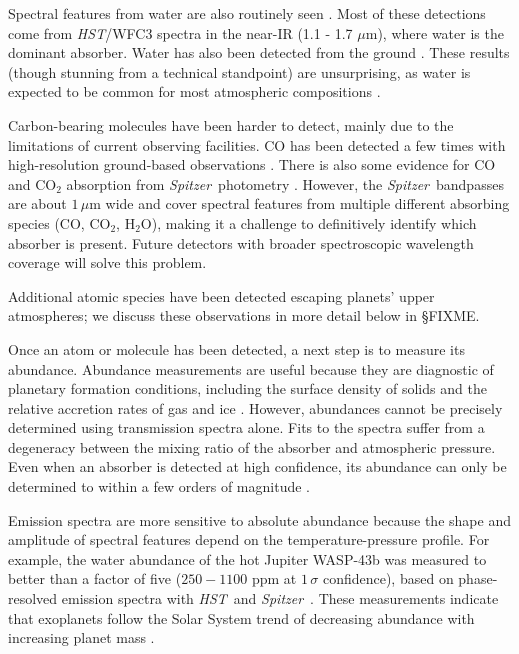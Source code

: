 \documentclass[graybox,natbib,nosecnum]{svmult}
\newcommand{\project}[1]{\textsl{#1}}
\newcommand{\HST}{\project{HST}}
\newcommand{\Spitzer}{\project{Spitzer}}
\begin{document}
Spectral features from water are also routinely seen \citep[e.g.][]{deming13, huitson13, mccullough14, fraine14, kreidberg14b, kreidberg15b, line16, evans16}. Most of these detections come from \HST/WFC3 spectra in the near-IR (1.1 - 1.7 $\mu$m), where water is the dominant absorber. Water has also been detected from the ground \citep{birkby13, stevenson16b}.  These results (though stunning from a technical standpoint) are unsurprising, as water is expected to be common for most atmospheric compositions \citep{moses13}.

Carbon-bearing molecules have been harder to detect, mainly due to the limitations of current observing facilities. CO has been detected a few times with high-resolution ground-based observations \citep{dekok13,brogi14}.  There is also some evidence for CO and CO$_2$ absorption from \Spitzer\ photometry \citep[e.g.][]{desert09}. However, the \Spitzer\ bandpasses are about $1\,\mu$m wide and cover spectral features from multiple different absorbing species (CO, CO$_2$, H$_2$O), making it a challenge to definitively identify which absorber is present. Future detectors with broader spectroscopic wavelength coverage will solve this problem.

Additional atomic species have been detected escaping planets' upper atmospheres; we discuss these observations in more detail below in \S FIXME. 

Once an atom or molecule has been detected, a next step is to measure its abundance. Abundance measurements are useful because they are diagnostic of planetary formation conditions, including the surface density of solids and the relative accretion rates of gas and ice \citep[e.g.][]{fortney13, mordasini16}.  However, abundances cannot be precisely determined using transmission spectra alone. Fits to the spectra suffer from a degeneracy between the mixing ratio of the absorber and atmospheric pressure. Even when an absorber is detected at high confidence, its abundance can only be determined to within a few orders of magnitude \citep{benneke12, griffith13, kreidberg15b}. 

Emission spectra are more sensitive to absolute abundance because the shape and amplitude of spectral features depend on the temperature-pressure profile. For example, the water abundance of the hot Jupiter WASP-43b was measured to better than a factor of five  ($250 - 1100$ ppm at $1\,\sigma$ confidence), based on phase-resolved emission spectra with \HST\ and \Spitzer\ \citep{stevenson17}. These measurements indicate that exoplanets follow the Solar System trend of decreasing abundance with increasing planet mass \citep{kreidberg14b, line16}.  
 
\end{document}
